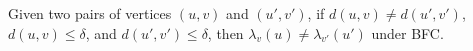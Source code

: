 


\begin{lemma}
\label{lemma:diff_lambda_diff_hop}
Given two pairs of vertices $(u,v)$ and $(u', v')$, if $d(u,v)\neq d(u',v')$, $d(u,v)\leq \delta$, and $d(u',v')\leq \delta$, then $\lambda_v(u) \neq \lambda_{v'}(u')$ under BFC.
\end{lemma}


